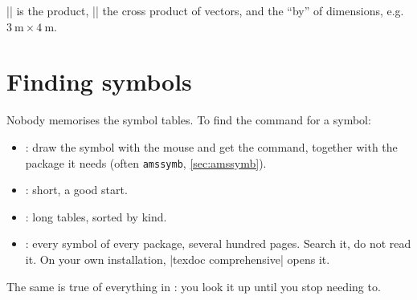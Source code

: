 \code|\cdot| is the product, \code|\times| the cross product of vectors,
and the \enquote{by} of dimensions, e.g.\ $\qty{3}{\metre} \times \qty{4}{\metre}$.

\section{Finding symbols}\label{sec:symbols}

Nobody memorises the symbol tables.
To find the command for a symbol:

\begin{itemize}
    \item {}:
        draw the symbol with the mouse and get the command,
        together with the package it needs (often \texttt{amssymb}, \autoref{sec:amssymb}).
    \item {}:
        short, a good start.
    \item {}:
        long tables, sorted by kind.
    \item {}:
        every symbol of every package, several hundred pages.
        Search it, do not read it.
        On your own installation, \code|texdoc comprehensive| opens it.
\end{itemize}

The same is true of everything in :
you look it up until you stop needing to.
